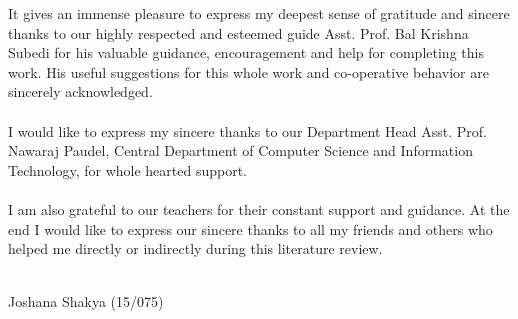 It gives an immense pleasure to express my deepest sense of gratitude and sincere thanks to our highly respected and esteemed guide Asst. Prof. Bal Krishna Subedi for his valuable guidance, encouragement and help for completing this work. His useful suggestions for this whole work and co-operative behavior are sincerely acknowledged.
\\\\
I would like to express my sincere thanks to our Department Head Asst. Prof. Nawaraj Paudel, Central Department of Computer Science and Information Technology, for whole hearted support.
\\\\
I am also grateful to our teachers for their constant support and guidance. At the end I would like to express our sincere thanks to all my friends and others who helped me directly or indirectly during this literature review.
\\\\
\begin{flushright}
Joshana Shakya (15/075)
\end{flushright}
